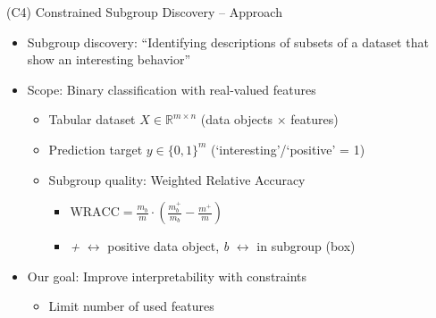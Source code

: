 \documentclass[en, navbarinline, handout]{sdqbeamer}
\begin{document}
\begin{frame}[t]{(C4) Constrained Subgroup Discovery -- Approach}
	\begin{itemize}
		\item Subgroup discovery: ``Identifying descriptions of subsets of a dataset that show an interesting behavior''~\cite{atzmueller2015subgroup}
		\pause
		\vspace{\baselineskip}
		\item Scope: Binary classification with real-valued features
		\begin{itemize}
			\item Tabular dataset $X \in \mathbb{R}^{m \times n}$ (data objects $\times$ features)
			\item Prediction target $y \in \{0, 1\}^m$ (`interesting'/`positive' = 1)
			\pause
			\item Subgroup quality: Weighted Relative Accuracy
			\begin{itemize}
				\item $\text{WRACC} = \frac{m_b}{m} \cdot \left( \frac{m_b^+}{m_b} - \frac{m^+}{m} \right)$~\cite{lavravc1999rule}
				\item \emph{+} $\leftrightarrow$ positive data object, \emph{b} $\leftrightarrow$ in subgroup (box)
			\end{itemize}
		\end{itemize}
		\pause
		\vspace{\baselineskip}
		\item Our goal: Improve interpretability with constraints
		\begin{itemize}
			\item Limit number of used features

\end{itemize}
\end{itemize}
\end{frame}
\end{document}
